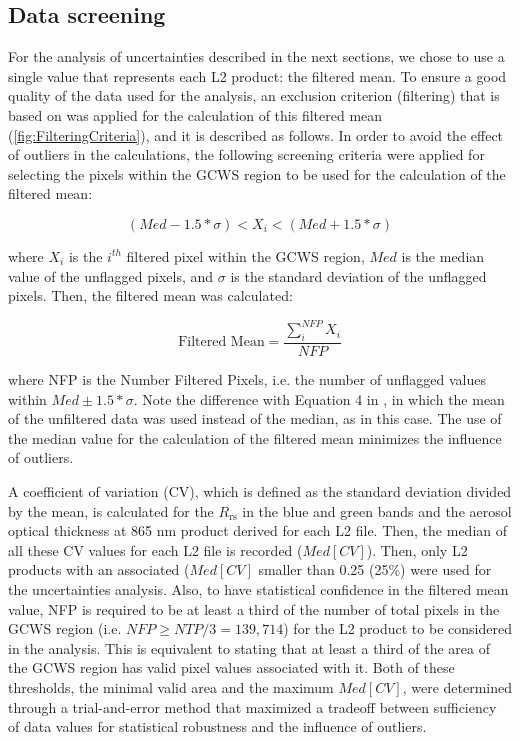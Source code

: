 \documentclass[remotesensing,article,submit,moreauthors,pdftex,10pt,a4paper]{Definitions/mdpi}
\begin{document}
\subsection{Data screening}
For the analysis of uncertainties described in the next sections, we chose to use a single value that represents each L2 product: the filtered mean. To ensure a good quality of the data used for the analysis, an exclusion criterion (filtering) that is based on \cite{Bailey2006} was applied for the calculation of this filtered mean (\autoref{fig:FilteringCriteria}), and it is described as follows. In order to avoid the effect of outliers in the calculations, the following screening criteria were applied for selecting the pixels within the GCWS region to be used for the calculation of the filtered mean: 
\begin{linenomath*}
\begin{equation}\label{eq:filtered_value}
  (Med-1.5*\sigma) <  X_i < (Med+1.5*\sigma)
\end{equation}
\end{linenomath*}
where $X_i$ is the $i^{th}$ filtered pixel within the GCWS region, $Med$ is the median value of the unflagged pixels, and $\sigma$ is the standard deviation of the unflagged pixels. Then, the filtered mean was calculated: 
\begin{linenomath*}
\begin{equation}\label{eq:filtered_mean}
  \text{Filtered Mean} =\frac{\displaystyle \sum_i^{NFP} X_i}{NFP}
\end{equation}
\end{linenomath*}
where NFP is the Number Filtered Pixels, i.e. the number of unflagged values within $Med\pm 1.5*\sigma$. Note the difference with Equation 4 in \cite{Bailey2006}, in which the mean of the unfiltered data was used instead of the median, as in this case. The use of the median value for the calculation of the filtered mean minimizes the influence of outliers.

A coefficient of variation (CV), which is defined as the standard deviation divided by the mean, is calculated for the $R_\text{rs}$ in the blue and green bands and the aerosol optical thickness at 865 nm product derived for each L2 file. Then, the median of all these CV values for each L2 file is recorded ($Med[CV]$). Then, only L2 products with an associated ($Med[CV]$ smaller than 0.25 (25\%) were used for the uncertainties analysis. Also, to have statistical confidence in the filtered mean value, NFP is required to be at least a third of the number of total pixels in the GCWS region (i.e. $NFP\geq NTP/3 = 139,714$) for the L2 product to be considered in the analysis. This is equivalent to stating that at least a third of the area of the GCWS region has valid pixel values associated with it. Both of these thresholds, the minimal valid area and the maximum $Med[CV]$, were determined through a trial-and-error method that maximized a tradeoff between sufficiency of data values for statistical robustness and the influence of outliers.
\end{document}
